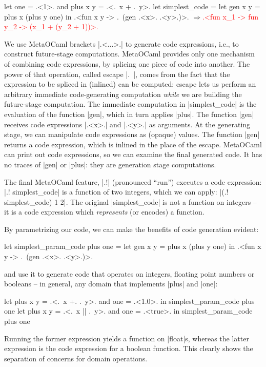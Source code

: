 \documentclass{elsart}
\newcommand{\evalresult}[1]{\ensuremath{\Longrightarrow}\textcolor{red}{#1}}
\begin{document}
\begin{code}
let one = .<1>. and plus x y = .<.~x + .~y>.
let simplest_code = let gen x y = plus x (plus y one) in
  .<fun x y -> .~(gen .<x>. .<y>.)>.
\evalresult{.<fun x_1 -> fun y_2 -> (x_1 + (y_2 + 1))>.}
\end{code}

We use MetaOCaml brackets |.<...>.| to generate code expressions,
i.e., to construct future-stage computations. MetaOCaml provides only
one mechanism of combining code expressions, by splicing one
piece of code into
another. The power of that operation, called escape |.~|, comes from
the fact that the expression to be spliced in (inlined) can be
computed: escape lets us perform an arbitrary immediate code-generating
computation \emph{while} we are
building the future-stage computation. The immediate computation in
|simplest_code| is the evaluation of the function |gen|, which in turn
applies |plus|. The function |gen| receives code expressions |.<x>.|
and |.<y>.| as arguments. At the generating stage, we can manipulate
code expressions as (opaque) values. The function |gen| returns a code
expression, which is inlined in the place of the escape. MetaOCaml can
print out code expressions, so we can examine the final generated code. It
has no traces of |gen| or |plus|: they are generation stage computations.

The final MetaOCaml feature, |.!| (pronounced ``run'') 
executes a code expression: |.! simplest_code| is a function of two
integers, which we can apply: |(.! simplest_code) 1 2|. The original
|simplest_code| is not a function on integers -- it is a code
expression which \emph{represents} (or encodes) a function.

By parametrizing our code, we can make the benefits of code generation
evident:

\begin{code}
let simplest_param_code plus one =
  let gen x y = plus x (plus y one) in
  .<fun x y -> .~(gen .<x>. .<y>.)>.
\end{code}
and use it to generate code that operates on integers, floating point
numbers or booleans -- in general, any domain that implements |plus|
and |one|:
\begin{code}
let plus x y = .<.~x +. .~y>. and one = .<1.0>. in
  simplest_param_code plus one
let plus x y = .<.~x || .~y>. and one = .<true>. in
  simplest_param_code plus one
\end{code}
Running the former expression yields a function on |float|s, whereas
the latter expression is the code expression for a boolean function.
This clearly shows the separation of concerns for domain
operations.
\end{document}
